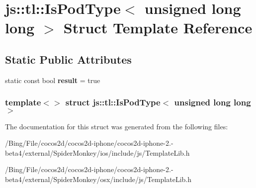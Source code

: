 \hypertarget{structjs_1_1tl_1_1_is_pod_type_3_01unsigned_01long_01long_01_4}{\section{js\-:\-:tl\-:\-:Is\-Pod\-Type$<$ unsigned long long $>$ Struct Template Reference}
\label{structjs_1_1tl_1_1_is_pod_type_3_01unsigned_01long_01long_01_4}
}
\subsection*{Static Public Attributes}
\begin{DoxyCompactItemize}
\item 
\hypertarget{structjs_1_1tl_1_1_is_pod_type_3_01unsigned_01long_01long_01_4_a9e47ce64165040a211fe96746d7431ac}{static const bool {\bfseries result} = true}\label{structjs_1_1tl_1_1_is_pod_type_3_01unsigned_01long_01long_01_4_a9e47ce64165040a211fe96746d7431ac}

\end{DoxyCompactItemize}
\subsubsection*{template$<$$>$ struct js\-::tl\-::\-Is\-Pod\-Type$<$ unsigned long long $>$}



The documentation for this struct was generated from the following files\-:\begin{DoxyCompactItemize}
\item 
/\-Bing/\-File/cocos2d/cocos2d-\/iphone/cocos2d-\/iphone-\/2.-\/beta4/external/\-Spider\-Monkey/ios/include/js/Template\-Lib.\-h\item 
/\-Bing/\-File/cocos2d/cocos2d-\/iphone/cocos2d-\/iphone-\/2.-\/beta4/external/\-Spider\-Monkey/osx/include/js/Template\-Lib.\-h\end{DoxyCompactItemize}
